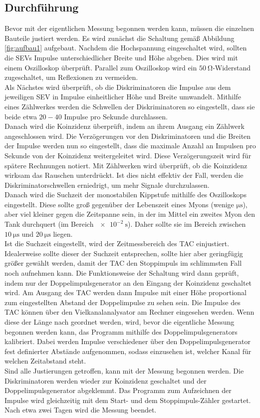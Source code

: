 \subsection{Durchführung}
\label{sec:durchführung}

Bevor mit der eigentlichen Messung begonnen werden kann, müssen die einzelnen Bauteile justiert werden.
Es wird zunächst die Schaltung gemäß Abbildung \ref{fig:aufbau1} aufgebaut.
Nachdem die Hochspannung eingeschaltet wird, sollten die SEVs Impulse unterschiedlicher Breite und Höhe abgeben.
Dies wird mit einem Oszilloskop überprüft.
Parallel zum Oszilloskop wird ein $\SI{50}{\ohm}$-Widerstand zugeschaltet, um Reflexionen zu vermeiden.\\
Als Nächstes wird überprüft, ob die Diskriminatoren die Impulse aus dem jeweiligen SEV in Impulse einheitlicher Höhe und Breite umwandelt.
Mithilfe eines Zählwerkes werden die Schwellen der Diskriminatoren so eingestellt, dass sie beide etwa $20-40$ Impulse pro Sekunde durchlassen.\\
Danach wird die Koinzidenz überprüft, indem an ihrem Ausgang ein Zählwerk angeschlossen wird.
Die Verzögerungen vor den Diskriminatoren und die Breiten der Impulse werden nun so eingestellt, dass die maximale Anzahl an Impulsen pro Sekunde von der Koinzidenz weitergeleitet wird.
Diese Verzögerungszeit wird für spätere Rechnungen notiert.
Mit Zählwerken wird überprüft, ob die Koinzidenz wirksam das Rauschen unterdrückt.
Ist dies nicht effektiv der Fall, werden die Diskriminatorschwellen erniedrigt, um mehr Signale durchzulassen.\\
Danach wird die Suchzeit der monostabilen Kippstufe mithilfe des Oszilloskops eingestellt.
Diese sollte groß gegenüber der Lebenszeit eines Myons (wenige $\si{\micro\second}$), aber viel kleiner gegen die Zeitspanne sein, in der im Mittel ein zweites Myon den Tank durchquert (im Bereich $\SI{e-2}{\second}$).
Daher sollte sie im Bereich zwischen $\SI{10}{\micro\second}$ und $\SI{20}{\micro\second}$ liegen.\\
Ist die Suchzeit eingestellt, wird der Zeitmessbereich des TAC einjustiert.
Idealerweise sollte dieser der Suchzeit entsprechen, sollte hier aber geringfügig größer gewählt werden, damit der TAC den Stoppimpuls im schlimmsten Fall noch aufnehmen kann.
Die Funktionsweise der Schaltung wird dann geprüft, indem nur der Doppelimpulsgenerator an den Eingang der Koinzidenz geschaltet wird.
Am Ausgang des TAC werden dann Impulse mit einer Höhe proportional zum eingestellten Abstand der Doppelimpulse zu sehen sein.
Die Impulse des TAC können über den Vielkanalanalysator am Rechner eingesehen werden.
Wenn diese der Länge nach geordnet werden, wird, bevor die eigentliche Messung begonnen werden kann, das Programm mithilfe des Doppelimpulsgenerators kalibriert.
Dabei werden Impulse verschiedener über den Doppelimpulsgenerator fest definierter Abstände aufgenommen, sodass einzusehen ist, welcher Kanal für welchen Zeitabstand steht.\\
Sind alle Justierungen getroffen, kann mit der Messung begonnen werden.
Die Diskriminatoren werden wieder zur Koinzidenz geschaltet und der Doppelimpulsgenerator abgeklemmt.
Das Programm zum Aufzeichnen der Impulse wird gleichzeitig mit dem Start- und dem Stoppimpuls-Zähler gestartet.
Nach etwa zwei Tagen wird die Messung beendet.
